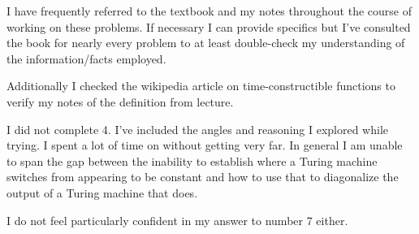 \documentclass[usletter]{article}
\begin{document}

I have frequently referred to the textbook \cite{textbook} and my notes throughout the course of working on these problems. If necessary I can provide specifics but I've consulted the book for nearly every problem to at least double-check my understanding of the information/facts employed.

Additionally I checked the wikipedia article on time-constructible functions \cite{wikipedia} to verify my notes of the definition from lecture.

I did not complete 4. I've included the angles and reasoning I explored while trying. I spent a lot of time on without getting very far. In general I am unable to span the gap between the inability to establish where a Turing machine switches from appearing to be constant and how to use that to diagonalize the output of a Turing machine that does.

I do not feel particularly confident in my answer to number 7 either.
\end{document}
